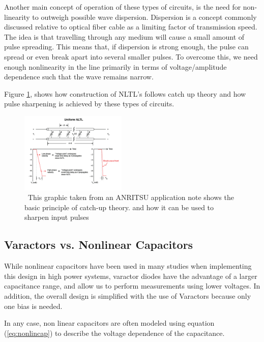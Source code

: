\documentclass[journal]{IEEEtran} \usepackage[english]{babel}
\begin{document}
Another main concept of operation of these types of circuits, is the need for
non-linearity to outweigh possible wave dispersion. Dispersion is a concept
commonly discussed relative to optical fiber cable as a limiting factor of
transmission speed. The idea is that travelling through any medium will cause a
small amount of pulse spreading. This means that, if dispersion is strong
enough, the pulse can spread or even break apart into several smaller pulses. To
overcome this, we need enough nonlinearity in the line primarily in terms of
voltage/amplitude dependence such that the wave remains narrow. 


Figure \ref{fig:shockline}\cite{shocklineNLTL}, shows how construction of NLTL's
follows catch up theory and how pulse sharpening is achieved by these types of
circuits. 



 \begin{figure}[htb]
\centering
\includegraphics[width=0.45\textwidth]{shockline_nltl_fig2.jpg}
\caption{\ This graphic taken from an ANRITSU application note shows the basic
principle of catch-up theory.
and how it can be used to sharpen input pulses}\label{fig:shockline}
\end{figure}

\subsection{Varactors vs. Nonlinear Capacitors}\label{sub:varacVSnonlincap}

While nonlinear capacitors have been used in many studies
\cite{FastHighVoltageNLTL} when implementing this design in high power systems,
varactor diodes have the advantage of a larger capacitance range, and allow us
to perform measurements using lower voltages. In addition, the overall design is
simplified with the use of Varactors because only one bias is needed.

In any case, non linear capacitors are often modeled using equation
(\ref{eq:nonlincap}) to describe the voltage dependence of the
capacitance\cite{nikoo2018theory}.
\end{document}
